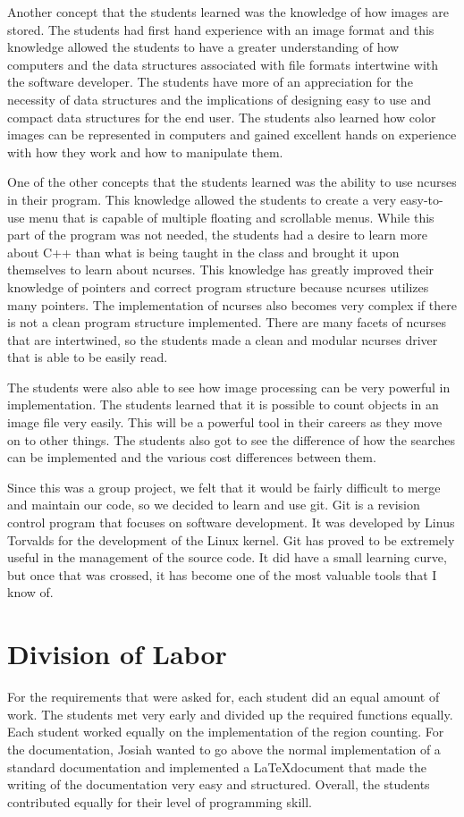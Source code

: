 \documentclass[pdftex, 11pt]{article}
\begin{document}
	Another concept that the students learned was the knowledge of how images are stored. The students had first hand
experience with an image format and this knowledge allowed the students to have a greater understanding of how computers
and the data structures associated with file formats intertwine with the software developer. The students have more of
an appreciation for the necessity of data structures and the implications of designing easy to use and compact data
structures for the end user. The students also learned how color images can be represented in computers and gained
excellent hands on experience with how they work and how to manipulate them.

	One of the other concepts that the students learned was the ability to use ncurses in their program. This knowledge
allowed the students to create a very easy-to-use menu that is capable of multiple floating and scrollable menus. While
this part of the program was not needed, the students had a desire to learn more about C++ than what is being taught in
the class and brought it upon themselves to learn about ncurses. This knowledge has greatly improved their knowledge of
pointers and correct program structure because ncurses utilizes many pointers. The implementation of ncurses also becomes
very complex if there is not a clean program structure implemented. There are many facets of ncurses that are
intertwined, so the students made a clean and modular ncurses driver that is able to be easily read.

The students were also able to see how image processing can be very powerful in implementation. The students learned
that it is possible to count objects in an image file very easily. This will be a powerful tool in their careers as they
move on to other things. The students also got to see the difference of how the searches can be implemented and the
various cost differences between them. 

	Since this was a group project, we felt that it would be fairly difficult to merge and maintain our code, so we decided
to learn and use git. Git is a revision control program that focuses on software development. It was developed by Linus
Torvalds for the development of the Linux kernel. Git has proved to be extremely useful in the management of the source
code. It did have a small learning curve, but once that was crossed, it has become one of the most valuable tools that I
know of.

\section{Division of Labor}

	For the requirements that were asked for, each student did an equal amount of work. The students met very early and
divided up the required functions equally. Each student worked equally on the implementation of the region counting. For the documentation,
Josiah wanted to go above the normal implementation of a standard documentation and implemented a \LaTeX document that
made the writing of the documentation very easy and structured. Overall, the students contributed equally for their
level of programming skill.
\end{document}
